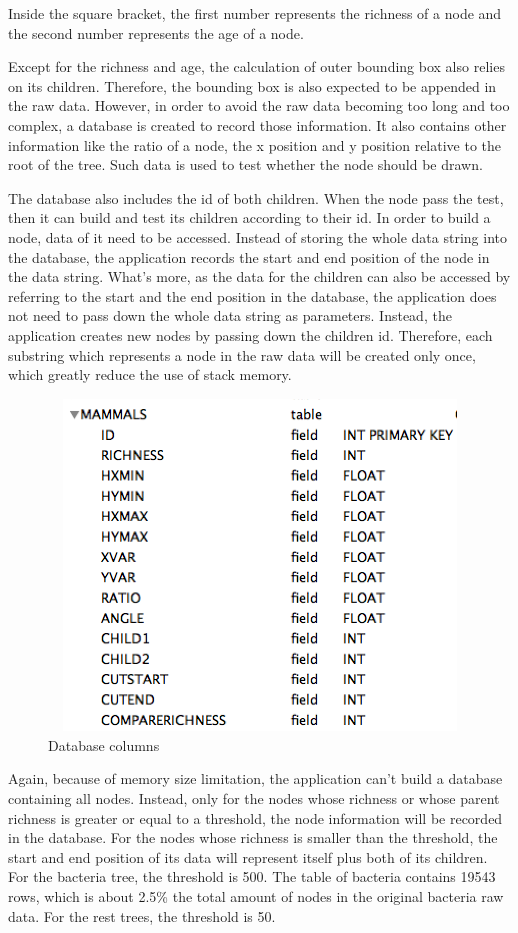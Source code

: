 \documentclass[a4paper,11pt,twoside]{report}
\begin{document}
Inside the square bracket, the first number represents the richness of a node and the second number represents the age of a node.

Except for the richness and age, the calculation of outer bounding box also relies on its children. Therefore, the bounding box is also expected to be appended in the raw data. However, in order to avoid the raw data becoming too long and too complex, a database is created to record those information. It also contains other information like the ratio of a node, the x position and y position relative to the root of the tree. Such data is used to test whether the node should be drawn. 

The database also includes the id of both children. When the node pass the test, then it can build and test its children according to their id. In order to build a node, data of it need to be accessed. Instead of storing the whole data string into the database, the application records the start and end position of the node in the data string. What's more, as the data for the children can also be accessed by referring to the start and the end position in the database, the application does not need to pass down the whole data string as parameters. Instead, the application creates new nodes by passing down the children id. Therefore, each substring which represents a node in the raw data will be created only once, which greatly reduce the use of stack memory. 

\begin{figure}[H]
  \centering
  \includegraphics [width=15cm,height=8.8cm]{Database}
  \caption{Database columns}
\end{figure}

Again, because of memory size limitation, the application can't build a database containing all nodes. Instead, only for the nodes whose richness or whose parent richness is greater or equal to a threshold, the node information will be recorded in the database. For the nodes whose richness is smaller than the threshold, the start and end position of its data will represent itself plus both of its children. For the bacteria tree, the threshold is 500. The table of bacteria contains  19543 rows, which is about 2.5\% the total amount of nodes in the original bacteria raw data. For the rest trees, the threshold is 50.
\end{document}
